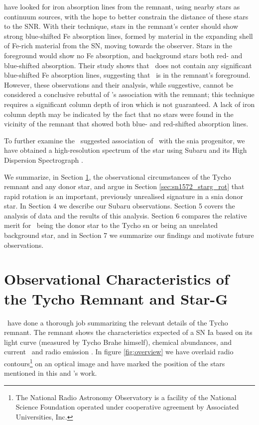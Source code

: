 \citet{2007PASJ...59..811I} have looked for iron absorption lines from
the remnant, using nearby stars as continuum sources, with the hope to
better constrain the distance of these stars to the SNR. With their technique, stars in the
remnant's center should show strong blue-shifted Fe absorption lines,
formed by material in the expanding shell of Fe-rich material from the
SN, moving towards the observer.  Stars in the foreground would show
no Fe absorption, and background stars both red- and blue-shifted
absorption. Their study shows that \starg\ does not contain any
significant blue-shifted Fe absorption lines, suggesting that \starg\
is in the remnant's foreground. However, these observations and their
analysis, while suggestive, cannot be considered a conclusive rebuttal
of \starg's association with the remnant; this technique requires a significant column depth of iron which is not guaranteed. A lack of iron column depth may be indicated by the fact that no stars were found in the
vicinity of the remnant that showed both blue- and red-shifted absorption lines.

To further examine the \rl\ suggested association of \starg\ with the
\gls{snia} progenitor, we have obtained a high-resolution spectrum of the
star using Subaru and its High Dispersion Spectrograph
\citep{1998SPIE.3355..354N}.

We summarize, in Section \ref{sec:sn1572_starg:obschar}, the observational
circumstances of the Tycho remnant and any donor star, and argue in
Section \ref{sec:sn1572_starg_rot} that rapid rotation is an important, previously unrealised
signature in a \gls{snia} \gls{donor} star. In Section 4 we describe our
Subaru observations. Section 5 covers the analysis of data and the results of this analysis. Section 6 compares the relative merit for \starg\ being the donor star to the
Tycho \gls{sn} or being an unrelated background star, and in Section 7 we summarize our findings and motivate future observations.

\section{Observational Characteristics of the Tycho Remnant and Star-G}
\label{sec:sn1572_starg:obschar}
\rl\ have done a thorough job summarizing the relevant details of the
Tycho remnant. The remnant shows the characteristics expected of a SN
Ia based on its light curve (measured by Tycho Brahe himself),
chemical abundances, and current \xray\ and radio emission
\citep{2004ApJ...612..357R}. In figure \ref{fig:overview} we have overlaid radio contours\footnote{The National Radio Astronomy Observatory is a facility of the National Science Foundation operated under cooperative agreement by Associated Universities, Inc.}  on an optical image and have marked the position of the stars mentioned in this and \rl's work.


